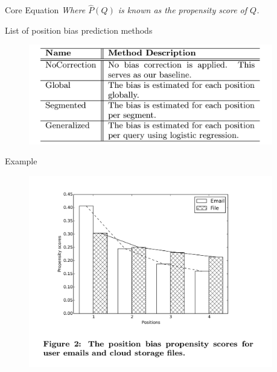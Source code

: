 \documentclass[final]{beamer}
\newlength{\sepwidth}
\newlength{\colwidth}
\newcommand{\separatorcolumn}{\begin{column}{\sepwidth}\end{column}}
\begin{document}
\begin{frame}[t]
\begin{columns}[t]
\begin{column}{\colwidth}
\begin{block}{Core Equation}
    \textit{Where \({\hat{P}(Q)}\) is known as the propensity score of \(Q\).}
  \end{block}

  \begin{block}{List of position bias prediction methods}
	   \begin{figure}
	\centering
	\includegraphics[width=0.9\linewidth]{Screenshot from 2025-04-20 21-17-05.png}
	\end{figure}
  \end{block}


	\begin{block}{Example}
	    \begin{figure}
		\centering
		\includegraphics[width=0.9\linewidth]{Screenshot from 2025-04-20 21-12-27.png}
		\end{figure}
	\end{block}
	

\end{column}

\separatorcolumn
\end{columns}
\end{frame}
\end{document}
